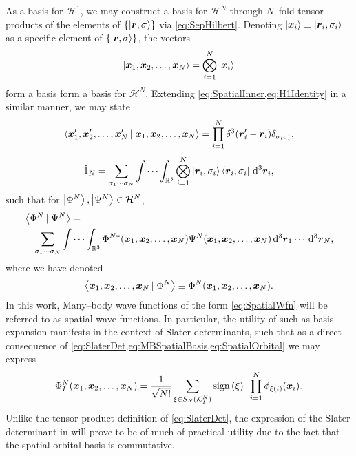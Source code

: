 As a basis for $\mathcal{H}^1$, we may construct a basis for $\mathcal{H}^N$ through $N$--fold tensor products 
of the elements of $\left \lbrace \left\vert \boldsymbol{r},\sigma \right\rangle \right\rbrace$ via \cref{eq:SepHilbert}. Denoting $\left\vert \boldsymbol{x}_i \right\rangle \equiv \left\vert \boldsymbol{r}_i,\sigma_i \right\rangle$ as
a specific element of $\left \lbrace \left\vert \boldsymbol{r},\sigma \right\rangle \right\rbrace$, the vectors
\begin{equation}
  \label{eq:MBSpatialBasis}
  \left\vert \boldsymbol{x}_1,\boldsymbol{x}_2,\ldots,\boldsymbol{x}_N \right\rangle = \bigotimes_{i = 1}^N \left\vert \boldsymbol{x}_i \right\rangle
\end{equation}
form a basis form a basis for $\mathcal{H}^N$. Extending \cref{eq:SpatialInner,eq:H1Identity} in a similar manner, we may state
\begin{equation}
  \left\langle \boldsymbol{x}'_1,\boldsymbol{x}'_2,\ldots,\boldsymbol{x}'_N \left\vert\right. \boldsymbol{x}_1,\boldsymbol{x}_2,\ldots,\boldsymbol{x}_N \right\rangle = \prod_{i=1}^N \delta^3(\boldsymbol{r}'_i - \boldsymbol{r}_i)\delta_{\sigma_i\sigma'_i},
\end{equation}
\begin{equation}
  \hat{1}_N = \sum_{\sigma_1\cdots\sigma_N}\idotsint_{\mathbb R^3} \bigotimes_{i=1}^N \left\vert \boldsymbol{r}_i,\sigma_i \right\rangle \left\langle \boldsymbol{r}_i,\sigma_i \right\vert \,\mathrm{d}^3\boldsymbol{r}_i,
\end{equation}
such that for $\left\vert \Phi^N \right\rangle,\left\vert \Psi^N \right\rangle \in \mathcal{H}^N$,
\begin{align}
&\left\langle \Phi^N \left\vert\right. \Psi^N \right\rangle = \nonumber \\&\quad \sum_{\sigma_1\cdots\sigma_N}\idotsint_{\mathbb R^3} 
  \Phi^{N*}(\boldsymbol{x}_1,\boldsymbol{x}_2,\ldots,\boldsymbol{x}_N) \Psi^{N}(\boldsymbol{x}_1,\boldsymbol{x}_2,\ldots,\boldsymbol{x}_N) \,\mathrm{d}^3\boldsymbol{r}_1 \cdots \,\mathrm{d}^3\boldsymbol{r}_N,
\end{align}
where we have denoted
\begin{equation}
  \label{eq:SpatialWfn}
  \left\langle \boldsymbol{x}_1,\boldsymbol{x}_2,\ldots,\boldsymbol{x}_N \left\vert\right. \Phi^N \right\rangle \equiv \Phi^N(\boldsymbol{x}_1,\boldsymbol{x}_2,\ldots,\boldsymbol{x}_N).
\end{equation}
In this work, Many--body wave functions of the form \cref{eq:SpatialWfn} will be referred to as spatial wave functions.
In particular, the utility of such as basis expansion manifests in the context of Slater determinants, such that as
a direct consequence of \cref{eq:SlaterDet,eq:MBSpatialBasis,eq:SpatialOrbital} we may express
\begin{equation}
  \label{eq:SlaterDetSpace}
  \Phi_I^N(\boldsymbol{x}_1,\boldsymbol{x}_2,\ldots,\boldsymbol{x}_N) = \frac{1}{\sqrt{N!}} \sum_{\xi \in S_N(\mathcal{K}^N_I)} \mathrm{sign}\left( \xi \right) \text{ } 
    \prod_{i = 1 }^N \phi_{\xi(i)}(\boldsymbol{x}_i).
\end{equation}
Unlike the tensor product definition of \cref{eq:SlaterDet}, the expression of the Slater determinant in will prove to be of 
much of practical utility due to the fact that the spatial orbital basis is commutative.

